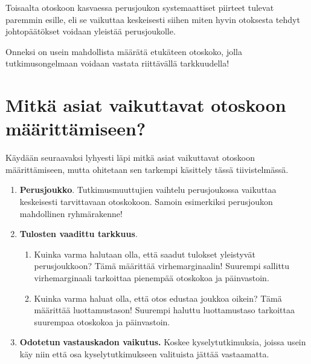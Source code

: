 \documentclass[
]{report}
\providecommand{\tightlist}{%
  \setlength{\itemsep}{0pt}\setlength{\parskip}{0pt}}\usepackage{longtable,booktabs,array}
\begin{document}
Toisaalta otoskoon kasvaessa perusjoukon systemaattiset piirteet tulevat
paremmin esille, eli se vaikuttaa keskeisesti siihen miten hyvin
otoksesta tehdyt johtopäätökset voidaan yleistää perusjoukolle.

Onneksi on usein mahdollista määrätä etukäteen otoskoko, jolla
tutkimusongelmaan voidaan vastata riittävällä tarkkuudella!

\hypertarget{mitkuxe4-asiat-vaikuttavat-otoskoon-muxe4uxe4rittuxe4miseen}{%
\section{Mitkä asiat vaikuttavat otoskoon
määrittämiseen?}\label{mitkuxe4-asiat-vaikuttavat-otoskoon-muxe4uxe4rittuxe4miseen}}

Käydään seuraavaksi lyhyesti läpi mitkä asiat vaikuttavat otoskoon
määrittämiseen, mutta ohitetaan sen tarkempi käsittely tässä
tiivistelmässä.

\begin{enumerate}
\def\labelenumi{\arabic{enumi}.}
\tightlist
\item
  \textbf{Perusjoukko}. Tutkimusmuuttujien vaihtelu perusjoukossa
  vaikuttaa keskeisesti tarvittavaan otoskokoon. Samoin esimerkiksi
  perusjoukon mahdollinen ryhmärakenne!
\item
  \textbf{Tulosten vaadittu tarkkuus}.

  \begin{enumerate}
  \def\labelenumii{\arabic{enumii}.}
  \tightlist
  \item
    Kuinka varma halutaan olla, että saadut tulokset yleistyvät
    perusjoukkoon? Tämä määrittää virhemarginaalin! Suurempi sallittu
    virhemarginaali tarkoittaa pienempää otoskokoa ja päinvastoin.
  \item
    Kuinka varma haluat olla, että otos edustaa joukkoa oikein? Tämä
    määrittää luottamustason! Suurempi haluttu luottamustaso tarkoittaa
    suurempaa otoskokoa ja päinvastoin.
  \end{enumerate}
\item
  \textbf{Odotetun} \textbf{vastauskadon vaikutus.} Koskee
  kyselytutkimuksia, joissa usein käy niin että osa kyselytutkimukseen
  valituista jättää vastaamatta.
\end{enumerate}
\end{document}

